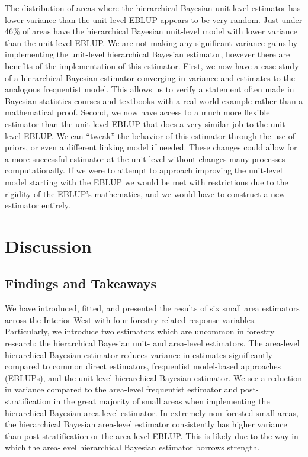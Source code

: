 \documentclass[12pt,twoside]{reedthesis}
\begin{document}
The distribution of areas where the hierarchical Bayesian unit-level estimator has lower variance than the unit-level EBLUP appears to be very random. Just under 46\% of areas have the hierarchical Bayesian unit-level model with lower variance than the unit-level EBLUP. We are not making any significant variance gains by implementing the unit-level hierarchical Bayesian estimator, however there are benefits of the implementation of this estimator. First, we now have a case study of a hierarchical Bayesian estimator converging in variance and estimates to the analogous frequentist model. This allows us to verify a statement often made in Bayesian statistics courses and textbooks with a real world example rather than a mathematical proof. Second, we now have access to a much more flexible estimator than the unit-level EBLUP that does a very similar job to the unit-level EBLUP. We can ``tweak'' the behavior of this estimator through the use of priors, or even a different linking model if needed. These changes could allow for a more successful estimator at the unit-level without changes many processes computationally. If we were to attempt to approach improving the unit-level model starting with the EBLUP we would be met with restrictions due to the rigidity of the EBLUP's mathematics, and we would have to construct a new estimator entirely.

\hypertarget{discussion}{%
\chapter{Discussion}\label{discussion}}

\hypertarget{findings-and-takeaways}{%
\section{Findings and Takeaways}\label{findings-and-takeaways}}

We have introduced, fitted, and presented the results of six small area estimators across the Interior West with four forestry-related response variables. Particularly, we introduce two estimators which are uncommon in forestry research: the hierarchical Bayesian unit- and area-level estimators. The area-level hierarchical Bayesian estimator reduces variance in estimates significantly compared to common direct estimators, frequentist model-based approaches (EBLUPs), and the unit-level hierarchical Bayesian estimator. We see a reduction in variance compared to the area-level frequentist estimator and post-stratification in the great majority of small areas when implementing the hierarchical Bayesian area-level estimator. In extremely non-forested small areas, the hierarchical Bayesian area-level estimator consistently has higher variance than post-stratification or the area-level EBLUP. This is likely due to the way in which the area-level hierarchical Bayesian estimator borrows strength.
\end{document}
